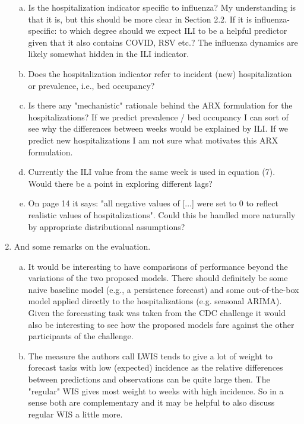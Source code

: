 \documentclass{article}
\begin{document}
\begin{enumerate}[1.]
\begin{enumerate}[a.]
\item Is the hospitalization indicator specific to influenza? My understanding is that it is, but this
should be more clear in Section 2.2. If it is influenza-specific: to which degree should we expect ILI
to be a helpful predictor given that it also contains COVID, RSV etc.? The influenza dynamics are
likely somewhat hidden in the ILI indicator.

\item Does the hospitalization indicator refer to incident (new) hospitalization or prevalence, i.e.,
bed occupancy?

\item Is there any "mechanistic" rationale behind the ARX formulation for the hospitalizations? If we
predict prevalence / bed occupancy I can sort of see why the differences between weeks would be
explained by ILI. If we predict new hospitalizations I am not sure what motivates this ARX
formulation.

\item Currently the ILI value from the same week is used in equation (7). Would there be a point in
exploring different lags?

\item On page 14 it says: "all negative values of [...] were set to 0 to reflect realistic values of
hospitalizations". Could this be handled more naturally by appropriate distributional assumptions?

\end{enumerate}


\item And some remarks on the evaluation.

\begin{enumerate}[a.]

\item It would be interesting to have comparisons of performance beyond the variations of the two
proposed models. There should definitely be some naive baseline model (e.g., a persistence
forecast) and some out-of-the-box model applied directly to the hospitalizations (e.g. seasonal
ARIMA). Given the forecasting task was taken from the CDC challenge it would also be interesting
to see how the proposed models fare against the other participants of the challenge.

\item The measure the authors call LWIS tends to give a lot of weight to forecast tasks with low
(expected) incidence as the relative differences between predictions and observations can be quite
large then. The "regular" WIS gives most weight to weeks with high incidence. So in a sense both
are complementary and it may be helpful to also discuss regular WIS a little more.


\end{enumerate}
\end{enumerate}
\end{document}
